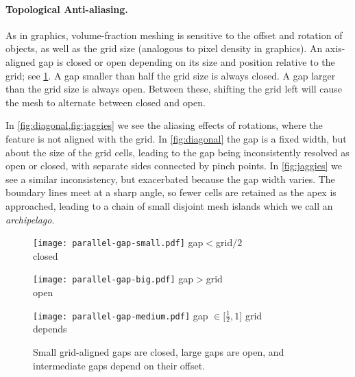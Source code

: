 \paragraph{Topological Anti-aliasing.}\label{sec:antialiasing}
As in graphics, volume-fraction meshing is sensitive to the offset and rotation of objects, as well as the grid size (analogous to pixel density in graphics).
An axis-aligned gap is closed or open depending on its size and position relative to the grid; see \cref{fig:parallel_axis_aligned_gap}. A gap smaller than half the grid size is always closed. A gap larger than the grid size is always open. Between these, shifting the grid left will cause the mesh to alternate between closed and open.

In \cref{fig:diagonal,fig:jaggies} we see the aliasing effects of rotations, where the feature is not aligned with the grid.
In \cref{fig:diagonal} the gap is a fixed width, but about the size of the grid cells, leading to the gap being inconsistently resolved as open or closed, with separate sides connected by pinch points.
In \cref{fig:jaggies} we see a similar inconsistency, but exacerbated because the gap width varies.
The boundary lines meet at a sharp angle, so fewer cells are retained as the apex is approached, leading to a chain of small disjoint mesh islands which we call an \emph{archipelago}.

\begin{figure}[b]
\centering
\subfloat
{
\begin{minipage}{0.28\columnwidth}
\centering
\texttt{[image: parallel-gap-small.pdf]}
\footnotesize gap$<$grid$/2$ \\ closed
\label{fig:parallel_gap_small}
\end{minipage}
}
\hspace{3pt}
\subfloat
{
\begin{minipage}{0.28\columnwidth}
\centering
\texttt{[image: parallel-gap-big.pdf]}
\footnotesize gap$>$grid \\ open
\label{fig:parallel_gap_big}
\end{minipage}
}
\hspace{3pt}
\subfloat
{
\begin{minipage}{0.28\columnwidth}
\centering
\texttt{[image: parallel-gap-medium.pdf]}
\footnotesize gap $\in \lbrack\frac{1}{2},1\rbrack$ grid \\ depends
\label{fig:parallel_gap_medium}
\end{minipage}
}
\caption{Small grid-aligned gaps are closed, large gaps are open, and intermediate gaps depend on their offset.}\label{fig:parallel_axis_aligned_gap}
\end{figure}


